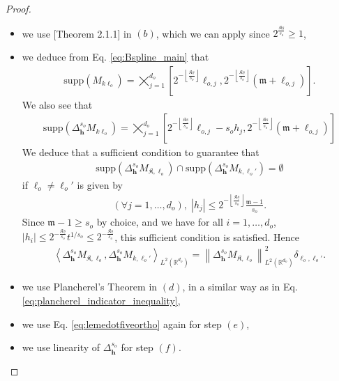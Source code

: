 \documentclass[11pt]{article}
\newcommand{\bl}{{\boldsymbol\ell}}
\newcommand{\0}{\mathbf{0}}
\newcommand{\bh}{\boldsymbol{h}}
\begin{document}
\begin{appendix}
\begin{proof}
\begin{itemize}
    \item we use \cite{leisner_nonlinear_wavelet_approximation_2003}[Theorem 2.1.1] in $(b)$, which we can apply since $2^{\frac{\mathfrak{K}\underline{s}}{s_o}}\geq 1$,
    \item we deduce from Eq. \eqref{eq:Bspline_main} that
    \begin{align*}
        \mathrm{supp}(M_{k\bl_o}) = \bigtimes_{j=1}^{d_o}\left[2^{-\left\lfloor\frac{\mathfrak{K}\underline{s}}{s_o}\right\rfloor}\ell_{o,j} , 2^{-\left\lfloor\frac{\mathfrak{K}\underline{s}}{s_o}\right\rfloor}(\mathfrak{m}+\ell_{o,j})\right].
    \end{align*}
    We also see that 
    \begin{align*}
        \mathrm{supp}(\Delta^{s_o}_{\bh}M_{k\bl_o}) = \bigtimes_{j=1}^{d_o}\left[2^{-\left\lfloor\frac{\mathfrak{K}\underline{s}}{s_o}\right\rfloor}\ell_{o,j} - s_oh_j , 2^{-\left\lfloor\frac{\mathfrak{K}\underline{s}}{s_o}\right\rfloor}(\mathfrak{m}+\ell_{o,j})\right]
    \end{align*}
    We deduce that a sufficient condition to guarantee that \begin{align*}
        \mathrm{supp}\left(\Delta^{s_o}_{\bh}M_{\mathfrak{K},\bl_o}\right)\cap\mathrm{supp}\left(\Delta^{s_o}_{\bh}M_{k,\bl_o'}\right) = \emptyset
    \end{align*}
    if $\bl_o\neq \bl_o'$ is given by 
    \begin{align*}
        (\forall j=1,\dots,d_o),\; |h_j|\leq 2^{-\left\lfloor\frac{\mathfrak{K}\underline{s}}{s_o}\right\rfloor}\frac{\mathfrak{m}-1}{s_o}.
    \end{align*}
    Since $\mathfrak{m}-1\geq s_o$ by choice, and we have for all $i = 1,\dots, d_o$, $|h_i|\leq 2^{-\frac{\mathfrak{K}\underline{s}}{s_o}}t^{1/s_o}\leq 2^{-\frac{\mathfrak{K}\underline{s}}{s_o}}$, this sufficient condition is satisfied. Hence 
    \begin{align}
        \label{eq:lemedotfiveortho}
        \left\langle \Delta^{s_o}_{\bh}M_{\mathfrak{K},\bl_o},\Delta^{s_o}_{\bh}M_{k,\bl_o'}\right\rangle_{L^2(\mathbb{R}^{d_o})} = \left\|\Delta^{s_o}_{\bh}M_{\mathfrak{K},\bl_o}\right\|_{L^2(\mathbb{R}^{d_o})}^2\delta_{\bl_o,\bl_o'}. 
    \end{align}
    \item we use Plancherel's Theorem in $(d)$, in a similar way as in Eq. \eqref{eq:plancherel_indicator_inequality},
    \item we use Eq. \eqref{eq:lemedotfiveortho} again for step $(e)$,
    \item we use linearity of $\Delta^{s_o}_{\bh}$ for step $(f)$. 

\end{itemize}
\end{proof}
\end{appendix}
\end{document}
